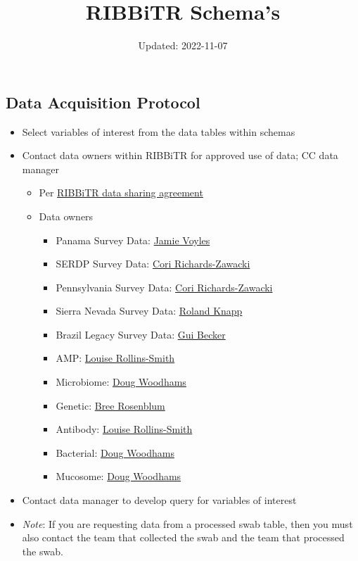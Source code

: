 \documentclass[
]{article}
\title{RIBBiTR Schema's}
\author{}
\date{\vspace{-2.5em}Updated: 2022-11-07}
\providecommand{\tightlist}{%
  \setlength{\itemsep}{0pt}\setlength{\parskip}{0pt}}
\begin{document}
\maketitle

\hypertarget{data-acquisition-protocol}{%
\subsection{Data Acquisition Protocol}\label{data-acquisition-protocol}}

\begin{itemize}
\tightlist
\item
  Select variables of interest from the data tables within schemas
\item
  Contact data owners within RIBBiTR for approved use of data; CC data
  manager

  \begin{itemize}
  \tightlist
  \item
    Per
    \href{https://docs.google.com/document/d/1m1EEuUH3ioVVXtFkDaWFHITddPcmputEhZxfW_omtrI/edit\#heading=h.q4aj1repk7gi}{RIBBiTR
    data sharing agreement}
  \item
    Data owners

    \begin{itemize}
    \tightlist
    \item
      Panama Survey Data: \href{jvoyles@unr.edu}{Jamie Voyles}
    \item
      SERDP Survey Data: \href{cori.zawacki@pitt.edu}{Cori
      Richards-Zawacki}
    \item
      Pennsylvania Survey Data: \href{cori.zawacki@pitt.edu}{Cori
      Richards-Zawacki}
    \item
      Sierra Nevada Survey Data: \href{roland.knapp@ucsb.edu}{Roland
      Knapp}
    \item
      Brazil Legacy Survey Data: \href{guibecker@psu.edu}{Gui Becker}
    \item
      AMP: \href{louise.rollins-smith@vanderbilt.edu}{Louise
      Rollins-Smith}
    \item
      Microbiome: \href{dwoodhams@gmail.com}{Doug Woodhams}
    \item
      Genetic: \href{rosenblum@berkeley.edu}{Bree Rosenblum}
    \item
      Antibody: \href{louise.rollins-smith@vanderbilt.edu}{Louise
      Rollins-Smith}
    \item
      Bacterial: \href{dwoodhams@gmail.com}{Doug Woodhams}
    \item
      Mucosome: \href{dwoodhams@gmail.com}{Doug Woodhams}
    \end{itemize}
  \end{itemize}
\item
  Contact data manager to develop query for variables of interest
\item
  \emph{Note}: If you are requesting data from a processed swab table,
  then you must also contact the team that collected the swab and the
  team that processed the swab.
\end{itemize}
\end{document}

